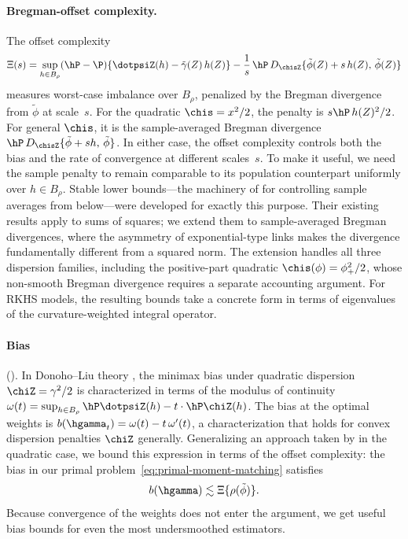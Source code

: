 \documentclass{article}
\begin{document}
\paragraph{Bregman-offset complexity.}
The offset complexity
\begin{equation}\label{eq:offset-complexity-intro}
\Xi(s) = \sup_{h \in B_\rho}
  (\hP - \P)\{\dotpsiZ(h) - \tilde\gamma(Z)\, h(Z)\}
  - \frac{1}{s}\, \hP\, D_{\chisZ}\{\tilde\phi(Z) + s\,h(Z),\, \tilde\phi(Z)\}
\end{equation}
measures worst-case imbalance
over $B_\rho$,
penalized by the Bregman divergence
from $\tilde\phi$ at scale~$s$.
For the quadratic $\chis = x^2/2$,
the penalty is $s\hP\, h(Z)^2/2$.
For general $\chis$,
it is the sample-averaged Bregman divergence
$\hP\, D_{\chisZ}\{\tilde\phi + sh,\, \tilde\phi\}$.
In either case,
the offset complexity controls
both the bias and the rate of convergence
at different scales~$s$.
To make it useful,
we need the sample penalty
to remain comparable
to its population counterpart
uniformly over $h \in B_\rho$.
Stable lower bounds---the
machinery of \citet{mendelson2015learning,mendelson2021extending}
for controlling sample averages from below---were
developed for exactly this purpose.
Their existing results apply to sums of squares;
we extend them
to sample-averaged Bregman divergences,
where the asymmetry of exponential-type links
makes the divergence
fundamentally different from a squared norm.
The extension handles all three
dispersion families,
including the positive-part quadratic
$\chis(\phi) = \phi_+^2/2$,
whose non-smooth Bregman divergence
requires a separate accounting argument.
For RKHS models,
the resulting bounds take a concrete form
in terms of eigenvalues
of the curvature-weighted integral operator.

\paragraph{Bias}
().
In Donoho--Liu theory
\citep{donoho1991geometrizing,donoho1994statistical},
the minimax bias under quadratic dispersion
$\chiZ = \gamma^2/2$
is characterized in terms of
the modulus of continuity
$\omega(t) = \sup_{h \in B_\rho}
  \hP \dotpsiZ(h) - t \cdot \hP \chiZ(h)$.
The bias at the optimal weights is
$b(\hgamma_t) = \omega(t) - t\,\omega'(t)$,
a characterization that holds for convex
dispersion penalties $\chiZ$ generally.
Generalizing an approach taken by \citet{kong2025asymptotics}
in the quadratic case, we bound this expression
in terms of the offset complexity:
the bias in our primal problem~\eqref{eq:primal-moment-matching}
satisfies
\[
b(\hgamma) \lesssim \Xi\{\rho(\tilde\phi)\}.
\]
Because convergence of the weights
does not enter the argument, we get useful
bias bounds for even the most undersmoothed
estimators.
\end{document}
